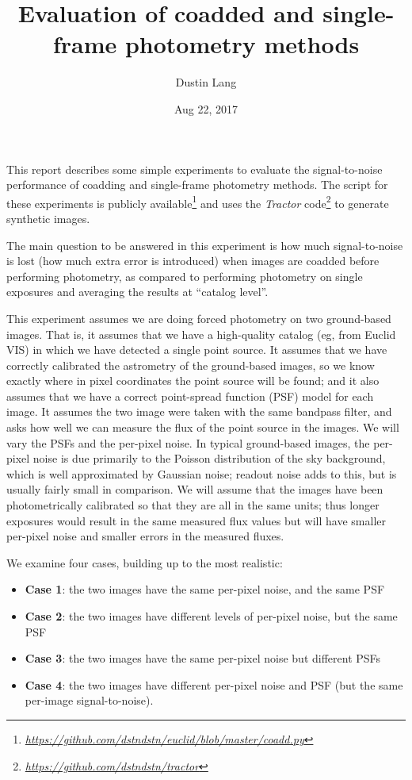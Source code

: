 \documentclass[letter,11pt]{article}
\author{Dustin Lang}
\date{Aug 22, 2017}
\title{Evaluation of coadded and single-frame photometry methods}
\newcommand{\niceurl}[1]{\href{#1}{\textsl{#1}}}
\newcommand{\code}[1]{\textsl{#1}}
\begin{document}
\maketitle

This report describes some simple experiments to evaluate the
signal-to-noise performance of coadding and single-frame photometry
methods.  The script for these experiments is publicly
available\footnote{%
  \niceurl{https://github.com/dstndstn/euclid/blob/master/coadd.py}}
and uses the \code{Tractor} code\footnote{%
  \niceurl{https://github.com/dstndstn/tractor}} to generate synthetic images.

The main question to be answered in this experiment is how much
signal-to-noise is lost (how much extra error is introduced) when
images are coadded before performing photometry, as compared to
performing photometry on single exposures and averaging the results at
``catalog level''.

This experiment assumes we are doing forced photometry on two
ground-based images.  That is, it assumes that we have a high-quality
catalog (eg, from Euclid VIS) in which we have detected a single point
source.  It assumes that we have correctly calibrated the astrometry
of the ground-based images, so we know exactly where in pixel
coordinates the point source will be found; and it also assumes that
we have a correct point-spread function (PSF) model for each image.
It assumes the two image were taken with the same bandpass filter, and
asks how well we can measure the flux of the point source in the
images.  We will vary the PSFs and the per-pixel noise.  In typical
ground-based images, the per-pixel noise is due primarily to the
Poisson distribution of the sky background, which is well approximated
by Gaussian noise; readout noise adds to this, but is usually fairly
small in comparison.  We will assume that the images have been
photometrically calibrated so that they are all in the same units;
thus longer exposures would result in the same measured flux values
but will have smaller per-pixel noise and smaller errors in the
measured fluxes.

We examine four cases, building up to the most realistic:
\begin{itemize}
\item \textbf{Case 1}: the two images have the same per-pixel noise,
  and the same PSF
\item \textbf{Case 2}: the two images have different levels of
  per-pixel noise, but the same PSF
\item \textbf{Case 3}: the two images have the same per-pixel noise
  but different PSFs
\item \textbf{Case 4}: the two images have different per-pixel noise
  and PSF (but the same per-image signal-to-noise).
\end{itemize}
\end{document}
